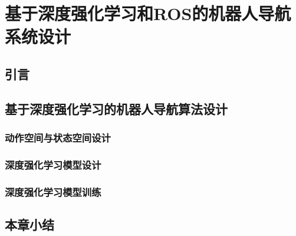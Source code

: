 \chapter{基于深度强化学习和ROS的机器人导航系统设计}

\section{引言}

\section{基于深度强化学习的机器人导航算法设计}
\subsection{动作空间与状态空间设计}
\subsection{深度强化学习模型设计}
\subsection{深度强化学习模型训练}

\section{本章小结}
